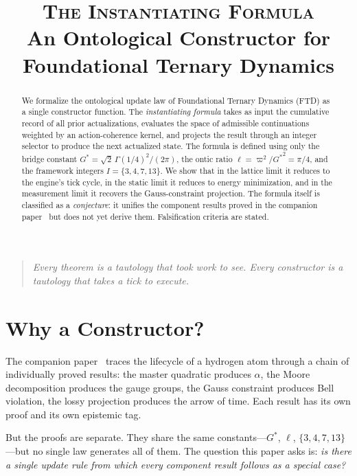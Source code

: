 \documentclass[11pt,a4paper]{article}
\title{\textsc{The Instantiating Formula}\\[6pt]
\large An Ontological Constructor for\\
Foundational Ternary Dynamics}
\author{}
\date{}
\newcommand{\Gstar}{{G^{*}}}
\newcommand{\vpi}{\varpi}
\newcommand{\onticell}{\ell}
\theoremstyle{compact}
\begin{document}
\maketitle
\thispagestyle{empty}

\begin{abstract}
\noindent We formalize the ontological update law of Foundational Ternary Dynamics (FTD) as a single constructor function. The \emph{instantiating formula} takes as input the cumulative record of all prior actualizations, evaluates the space of admissible continuations weighted by an action-coherence kernel, and projects the result through an integer selector to produce the next actualized state. The formula is defined using only the bridge constant $\Gstar = \sqrt{2}\,\Gamma(1/4)^2/(2\pi)$, the ontic ratio $\onticell = \vpi^2/{G^*}^2 = \pi/4$, and the framework integers $I = \{3, 4, 7, 13\}$. We show that in the lattice limit it reduces to the engine's tick cycle, in the static limit it reduces to energy minimization, and in the measurement limit it recovers the Gauss-constraint projection. The formula itself is classified as a \emph{conjecture}: it unifies the component results proved in the companion paper~\cite{lifecycle} but does not yet derive them. Falsification criteria are stated.
\end{abstract}

\smallskip

\begin{quote}\itshape
Every theorem is a tautology that took work to see. Every constructor is a tautology that takes a tick to execute.
\end{quote}


\section{Why a Constructor?}
\label{sec:why}

The companion paper~\cite{lifecycle} traces the lifecycle of a hydrogen atom through a chain of individually proved results: the master quadratic produces $\alpha$, the Moore decomposition produces the gauge groups, the Gauss constraint produces Bell violation, the lossy projection produces the arrow of time. Each result has its own proof and its own epistemic tag.

But the proofs are separate. They share the same constants---$\Gstar$, $\onticell$, $\{3, 4, 7, 13\}$---but no single law generates all of them. The question this paper asks is: \emph{is there a single update rule from which every component result follows as a special case?}
\end{document}
